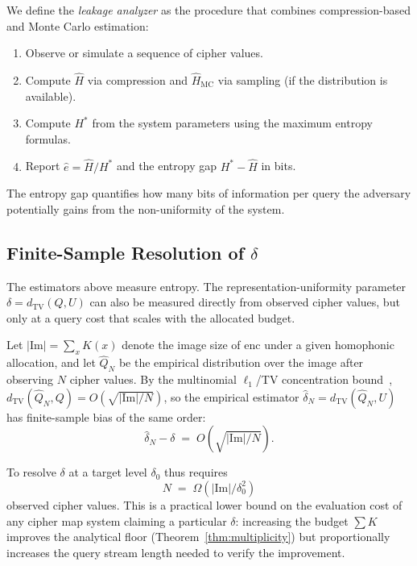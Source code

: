 \documentclass[conference]{IEEEtran}
\theoremstyle{definition}
\theoremstyle{plain}
\theoremstyle{remark}
\newcommand{\enc}{\mathrm{enc}}
\newcommand{\im}{\mathrm{Im}}
\newcommand{\TV}{d_{\mathrm{TV}}}
\begin{document}
We define the \emph{leakage analyzer} as the procedure that combines
compression-based and Monte Carlo estimation:
\begin{enumerate}
\item Observe or simulate a sequence of cipher values.
\item Compute $\hat{H}$ via compression and $\hat{H}_{\mathrm{MC}}$ via
  sampling (if the distribution is available).
\item Compute $H^*$ from the system parameters using the maximum entropy
  formulas.
\item Report $\hat{e} = \hat{H} / H^*$ and the entropy gap
  $H^* - \hat{H}$ in bits.
\end{enumerate}
The entropy gap quantifies how many bits of information per query the
adversary potentially gains from the non-uniformity of the system.

\subsection{Finite-Sample Resolution of \texorpdfstring{$\delta$}{delta}}
\label{subsec:finite-sample}

The estimators above measure entropy.  The representation-uniformity
parameter $\delta = \TV(Q, U)$ can also be measured directly from
observed cipher values, but only at a query cost that scales with the
allocated budget.

Let $|\im| = \sum_x K(x)$ denote the image size of $\enc$ under a given
homophonic allocation, and let $\hat{Q}_N$ be the empirical
distribution over the image after observing $N$ cipher values.  By the
multinomial $\ell_1$/TV concentration
bound~\cite{devroye1996nonparametric},
$\TV(\hat{Q}_N, Q) = O(\sqrt{|\im|/N})$, so the
empirical estimator $\hat{\delta}_N = \TV(\hat{Q}_N, U)$ has
finite-sample bias of the same order:
\begin{equation}
\hat{\delta}_N - \delta \;=\; O\!\left(\sqrt{|\im|/N}\right).
\label{eq:finite-sample-bias}
\end{equation}

To resolve $\delta$ at a target level $\delta_0$ thus requires
\begin{equation}
N \;=\; \Omega\!\left(|\im| / \delta_0^2\right)
\label{eq:n-required}
\end{equation}
observed cipher values.  This is a practical lower bound on the
evaluation cost of any cipher map system claiming a particular
$\delta$: increasing the budget $\sum K$ improves the analytical
floor (Theorem~\ref{thm:multiplicity}) but proportionally increases
the query stream length needed to verify the improvement.
\end{document}
